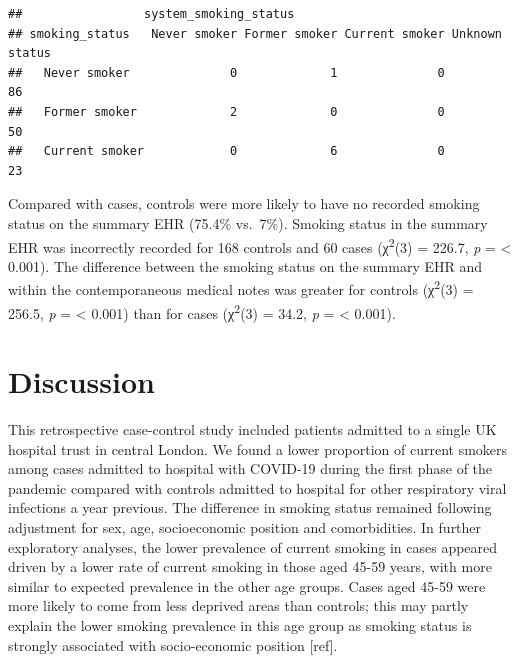 \documentclass[
]{article}
\newenvironment{Shaded}{\begin{snugshade}}{\end{snugshade}}
\newcommand{\KeywordTok}[1]{\textcolor[rgb]{0.13,0.29,0.53}{\textbf{#1}}}
\newcommand{\NormalTok}[1]{#1}
\newcommand{\OperatorTok}[1]{\textcolor[rgb]{0.81,0.36,0.00}{\textbf{#1}}}
\newcommand{\StringTok}[1]{\textcolor[rgb]{0.31,0.60,0.02}{#1}}
\begin{document}
\begin{verbatim}
##                 system_smoking_status
## smoking_status   Never smoker Former smoker Current smoker Unknown status
##   Never smoker              0             1              0             86
##   Former smoker             2             0              0             50
##   Current smoker            0             6              0             23
\end{verbatim}

\begin{Shaded}
\end{Shaded}

Compared with cases, controls were more likely to have no recorded
smoking status on the summary EHR (75.4\% vs.~7\%). Smoking status in
the summary EHR was incorrectly recorded for 168 controls and 60 cases
(χ\textsuperscript{2}(3) = 226.7, \emph{p} = \textless{} 0.001). The
difference between the smoking status on the summary EHR and within the
contemporaneous medical notes was greater for controls
(χ\textsuperscript{2}(3) = 256.5, \emph{p} = \textless{} 0.001) than for
cases (χ\textsuperscript{2}(3) = 34.2, \emph{p} = \textless{} 0.001).

\hypertarget{discussion}{%
\section{\texorpdfstring{\textbf{Discussion}}{Discussion}}\label{discussion}}

This retrospective case-control study included patients admitted to a
single UK hospital trust in central London. We found a lower proportion
of current smokers among cases admitted to hospital with COVID-19 during
the first phase of the pandemic compared with controls admitted to
hospital for other respiratory viral infections a year previous. The
difference in smoking status remained following adjustment for sex, age,
socioeconomic position and comorbidities. In further exploratory
analyses, the lower prevalence of current smoking in cases appeared
driven by a lower rate of current smoking in those aged 45-59 years,
with more similar to expected prevalence in the other age groups. Cases
aged 45-59 were more likely to come from less deprived areas than
controls; this may partly explain the lower smoking prevalence in this
age group as smoking status is strongly associated with socio-economic
position {[}ref{]}.
\end{document}
